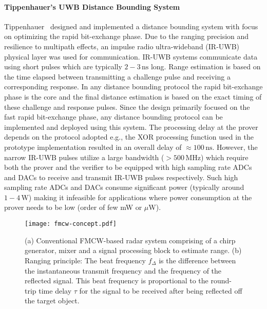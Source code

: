 \documentclass{sig-alternate-10pt}
\newcommand{\unit}[1]{\ensuremath{\, \mathrm{#1}}}
\begin{document}
\paragraph{Tippenhauer's UWB Distance Bounding System}
Tippenhauer~\cite{Tippenhauer12} designed and implemented a distance bounding
system with focus on optimizing the rapid bit-exchange phase. Due to the ranging
precision and resilience to multipath effects, an impulse radio ultra-wideband
(IR-UWB) physical layer was used for communication. IR-UWB systems communicate
data using short pulses which are typically $2-3\unit{ns}$ long. Range
estimation is based on the time elapsed between transmitting a challenge pulse
and receiving a corresponding response. In any distance bounding protocol the
rapid bit-exchange phase is the core and the final distance estimation is based
on the exact timing of these challenge and response pulses. Since the design
primarily focused on the fast rapid bit-exchange phase, any distance bounding
protocol can be implemented and deployed using this system. The processing delay
at the prover depends on the protocol adopted e.g., the XOR processing function
used in the prototype implementation resulted in an overall delay of $\approx
100\unit{ns}$. However, the narrow IR-UWB pulses utilize a large bandwidth
($>500\unit{MHz}$) which require both the prover and the verifier to be equipped
with high sampling rate ADCs and DACs to receive and transmit IR-UWB pulses
respectively. Such high sampling rate ADCs and DACs consume significant power
(typically around $1-4 \unit{W}$) making it infeasible for applications where power
consumption at the prover needs to be low (order of few mW or
$\mu$W).

\begin{figure*}[t]
  \centering
  \texttt{[image: fmcw-concept.pdf]}
  \caption{(a) Conventional FMCW-based radar system comprising of a chirp
    generator, mixer and a signal processing block to estimate range. (b)
    Ranging principle: The beat frequency $f_{\Delta}$ is the difference
    between the instantaneous transmit frequency and the frequency of the
    reflected signal. This beat frequency is proportional to the round-trip
    time delay $\tau$ for the signal to be received after being reflected off
    the target object.}
  \label{fig:fmcw-concept}
\end{figure*}
\end{document}
